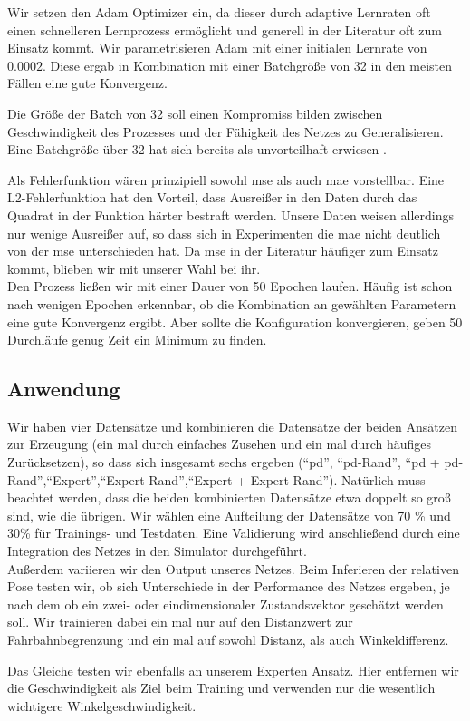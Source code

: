 Wir setzen den Adam Optimizer ein, da dieser durch adaptive Lernraten oft einen schnelleren Lernprozess ermöglicht und generell in der Literatur oft zum Einsatz kommt. Wir parametrisieren Adam mit einer initialen Lernrate von $0.0002$. Diese ergab in Kombination mit einer Batchgröße von 32 in den meisten Fällen eine gute Konvergenz.

Die Größe der Batch von 32 soll einen Kompromiss bilden zwischen Geschwindigkeit des Prozesses und der Fähigkeit des Netzes zu Generalisieren. Eine Batchgröße über 32 hat sich bereits als unvorteilhaft erwiesen \cite{keskar2017largebatch}.

Als Fehlerfunktion wären prinzipiell sowohl \acs{mse} als auch \acs{mae} vorstellbar. Eine L2-Fehlerfunktion hat den Vorteil, dass Ausreißer in den Daten durch das Quadrat in der Funktion härter bestraft werden. Unsere Daten weisen allerdings nur wenige Ausreißer auf, so dass sich in Experimenten die \acs{mae} nicht deutlich von der \acs{mse} unterschieden hat. Da \acs{mse} in der Literatur häufiger zum Einsatz kommt, blieben wir mit unserer Wahl bei ihr. \\

Den Prozess ließen wir mit einer Dauer von 50 Epochen laufen.  Häufig ist schon nach wenigen Epochen erkennbar, ob die Kombination an gewählten Parametern eine gute Konvergenz ergibt. Aber sollte die Konfiguration konvergieren, geben 50 Durchläufe genug Zeit ein Minimum zu finden.

\subsection{Anwendung}

Wir haben vier Datensätze und kombinieren die Datensätze der beiden Ansätzen zur Erzeugung (ein mal durch einfaches Zusehen und ein mal durch häufiges Zurücksetzen), so dass sich insgesamt sechs ergeben (``\acs{pd}'', ``\acs{pd}-Rand'', ``\acs{pd} + \acs{pd}-Rand'',``Expert'',``Expert-Rand'',``Expert + Expert-Rand''). Natürlich muss beachtet werden, dass die beiden kombinierten Datensätze etwa doppelt so groß sind, wie die übrigen. Wir wählen eine Aufteilung der Datensätze von 70 \% und 30\% für Trainings- und Testdaten. Eine Validierung wird anschließend durch eine Integration des Netzes in den Simulator durchgeführt.\\

Außerdem variieren wir den Output unseres Netzes. Beim Inferieren der relativen Pose testen wir, ob sich Unterschiede in der Performance des Netzes ergeben, je nach dem ob ein zwei- oder eindimensionaler Zustandsvektor geschätzt werden soll. Wir trainieren dabei ein mal nur auf den Distanzwert zur Fahrbahnbegrenzung und ein mal auf sowohl Distanz, als auch Winkeldifferenz.

Das Gleiche testen wir ebenfalls an unserem Experten Ansatz. Hier entfernen wir die Geschwindigkeit als Ziel beim Training und verwenden nur die wesentlich wichtigere Winkelgeschwindigkeit.
